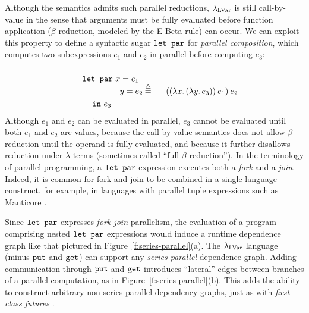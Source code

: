 Although the semantics admits such parallel
reductions, $\lambda_{\textrm{LVar}}$ is still call-by-value in the sense that
arguments must be fully evaluated before function
application ($\beta$-reduction, modeled by the {\sc E-Beta} rule) can occur.  We can exploit this
property to define a syntactic sugar $\mbox{\texttt{\mbox{\texttt{let}}~\mbox{\texttt{par}}}}$ for {\em parallel composition}, which 
computes two subexpressions $e_1$ and $e_2$ in
parallel before computing $e_3$:
\begin{displaymath}
\begin{minipage}[b]{0.8in}
  \begin{equation*}
\begin{split}
& \LETPAR ~x = e_1 \\ 
& \letparspace ~y = e_2 \\
& \letspace \IN~e_3 
\end{split}
\end{equation*}
\end{minipage}
\begin{minipage}[b]{0.6in}
\centering
$\defeq$
\end{minipage}
\begin{minipage}[b]{1in}
\begin{equation*}
  \app{(\app{(\lam{x}{(\lam{y}{e_3})})}{e_1})}{e_2}
\end{equation*}
\end{minipage}
\end{displaymath}
\noindent Although $e_1$ and $e_2$ can be evaluated in parallel, $e_3$
cannot be evaluated until both $e_1$ and $e_2$ are values, because the
call-by-value semantics does not allow $\beta$-reduction until the
operand is fully evaluated, and because it further disallows reduction
under $\lambda$-terms (sometimes called ``full $\beta$-reduction'').
In the terminology of parallel programming, a $\mbox{\texttt{\mbox{\texttt{let}}~\mbox{\texttt{par}}}}$ expression
executes both a {\em fork} and a {\em join}.  Indeed, it is common for
fork and join to be combined in a single language construct, for
example, in languages with parallel tuple expressions such as
Manticore \cite{manticore_parallel_tuples}.

Since $\mbox{\texttt{\mbox{\texttt{let}}~\mbox{\texttt{par}}}}$ expresses {\em fork-join}
parallelism, the evaluation of a program comprising nested $\mbox{\texttt{\mbox{\texttt{let}}~\mbox{\texttt{par}}}}$
expressions would induce a runtime dependence graph like that pictured 
in
Figure~\ref{f:series-parallel}(a).  
The $\lambda_{\textrm{LVar}}$ language (minus $\mbox{\texttt{put}}$ and $\mbox{\texttt{get}}$) can
support any {\em series-parallel} dependence graph.  Adding
communication through $\mbox{\texttt{put}}$ and $\mbox{\texttt{get}}$ introduces ``lateral'' edges
between branches of a parallel computation,
as in
Figure~\ref{f:series-parallel}(b).  This adds the ability to
construct arbitrary non-series-parallel dependency graphs, just as with 
 {\em first-class
  futures} \cite{beyond-nested-workstealing}.




